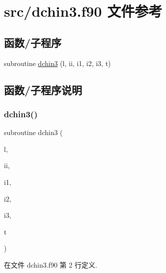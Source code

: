 \hypertarget{dchin3_8f90}{}\section{src/dchin3.f90 文件参考}
\label{dchin3_8f90}
\subsection*{函数/子程序}
\begin{DoxyCompactItemize}
\item 
subroutine \mbox{\hyperlink{dchin3_8f90_a999bd709743bf8a06ac16aed5f65be0f}{dchin3}} (l, ii, i1, i2, i3, t)
\end{DoxyCompactItemize}


\subsection{函数/子程序说明}
\mbox{\label{dchin3_8f90_a999bd709743bf8a06ac16aed5f65be0f}} 
\subsubsection{\texorpdfstring{dchin3()}{dchin3()}}
{\footnotesize\ttfamily subroutine dchin3 (\begin{DoxyParamCaption}\item[{}]{l,  }\item[{}]{ii,  }\item[{}]{i1,  }\item[{}]{i2,  }\item[{}]{i3,  }\item[{}]{t }\end{DoxyParamCaption})}



在文件 dchin3.\+f90 第 2 行定义.

